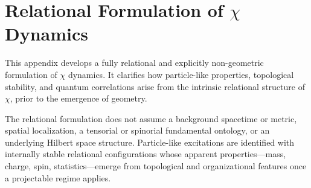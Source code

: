 \clearpage

\section{Relational Formulation of \texorpdfstring{$\chi$}{χ} Dynamics}
\label{app:relational_formulation}

This appendix develops a fully relational and explicitly non-geometric formulation of $\chi$ dynamics.
It clarifies how particle-like properties, topological stability, and
quantum correlations arise from the intrinsic relational structure of~$\chi$, prior to the emergence of geometry.

The relational formulation does not assume a background spacetime or
metric, spatial localization, a tensorial or spinorial fundamental
ontology, or an underlying Hilbert space structure.
Particle-like excitations are identified with internally stable
relational configurations whose apparent properties---mass, charge, spin,
statistics---emerge from topological and organizational features once a
projectable regime applies.












